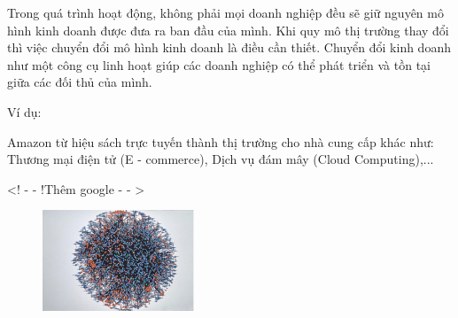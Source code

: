




Trong quá trình hoạt động, không phải mọi doanh nghiệp đều sẽ giữ nguyên mô hình kinh doanh được đưa ra ban đầu của mình. Khi quy mô thị trường thay đổi thì việc chuyển đổi mô hình kinh doanh là điều cần thiết. Chuyển đổi kinh doanh như một công cụ linh hoạt giúp các doanh nghiệp có thể phát triển và tồn tại giữa các đối thủ của mình.

Ví dụ:

Amazon từ hiệu sách trực tuyến thành thị trường cho nhà cung cấp khác như: Thương mại điện tử (E - commerce), Dịch vụ đám mây (Cloud Computing),...

<! - - !Thêm google - - >



\begin{figure}[h]

\centering

\includegraphics[height = 3cm]{pictures/KienTrucViDichVuAmazon.png}


\end{figure}

